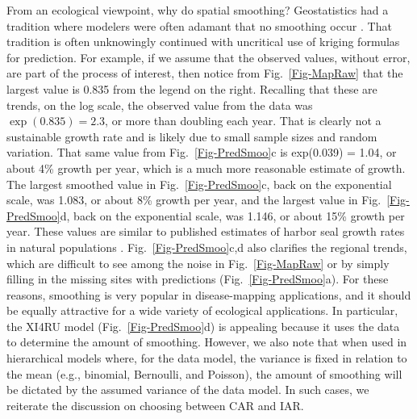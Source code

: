 \documentclass[11pt, titlepage]{article}\usepackage[]{graphicx}\usepackage[]{color}
\begin{document}
\begin{spacing}{1.9}
\begin{flushleft}
From an ecological viewpoint, why do spatial smoothing?  Geostatistics had a tradition where modelers were often adamant that no smoothing occur \citep[``honoring the data,''][p. 224]{Scha:Gotw:stat:2005}. That tradition is often unknowingly continued with uncritical use of kriging formulas for prediction.  For example, if we assume that the observed values, without error, are part of the process of interest, then notice from Fig.~\ref{Fig-MapRaw} that the largest value is 0.835 from the legend on the right.  Recalling that these are trends, on the log scale, the observed value from the data was $\exp(0.835)=2.3$, or more than doubling each year.  That is clearly not a sustainable growth rate and is likely due to small sample sizes and random variation.  That same value from Fig.~\ref{Fig-PredSmoo}c is exp(0.039) = 1.04, or about 4\% growth per year, which is a much more reasonable estimate of growth.  The largest smoothed value in Fig.~\ref{Fig-PredSmoo}c, back on the exponential scale, was 1.083, or about 8\% growth per year, and the largest value in Fig.~\ref{Fig-PredSmoo}d, back on the exponential scale, was 1.146, or about 15\% growth per year. These values are similar to published estimates of harbor seal growth rates in natural populations \citep[e.g.,][]{Hast:Smal:Pend:sex:2012}.  Fig.~\ref{Fig-PredSmoo}c,d also clarifies the regional trends, which are difficult to see among the noise in Fig.~\ref{Fig-MapRaw} or by simply filling in the missing sites with predictions (Fig.~\ref{Fig-PredSmoo}a).  For these reasons, smoothing is very popular in disease-mapping applications, and it should be equally attractive for a wide variety of ecological applications. In particular, the XI4RU model (Fig.~\ref{Fig-PredSmoo}d) is appealing because it uses the data to determine the amount of smoothing.  However, we also note that when used in hierarchical models where, for the data model, the variance is fixed in relation to the mean (e.g., binomial, Bernoulli, and Poisson), the amount of smoothing will be dictated by the assumed variance of the data model.  In such cases, we reiterate the discussion on choosing between CAR and IAR.


\end{flushleft}
\end{spacing}
\end{document}
